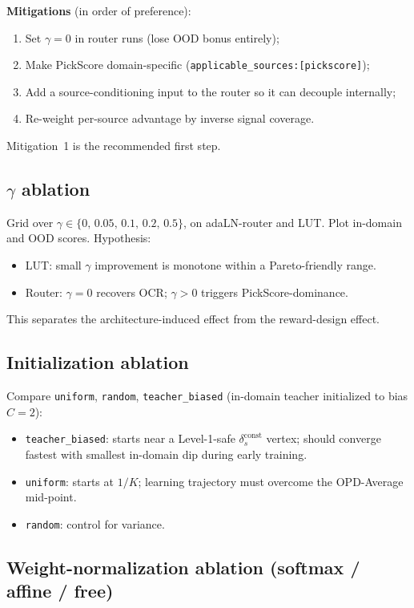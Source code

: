 \documentclass[11pt,a4paper]{article}
\newcommand{\const}{\mathrm{const}}
\theoremstyle{definition}
\begin{document}
\textbf{Mitigations} (in order of preference):
\begin{enumerate}[leftmargin=1.5em]
\item Set $\gamma=0$ in router runs (lose OOD bonus entirely);
\item Make PickScore domain-specific (\texttt{applicable\_sources:[pickscore]});
\item Add a source-conditioning input to the router so it can decouple
internally;
\item Re-weight per-source advantage by inverse signal coverage.
\end{enumerate}
Mitigation~1 is the recommended first step.

\subsection{$\gamma$ ablation}

Grid over $\gamma \in \{0,\,0.05,\,0.1,\,0.2,\,0.5\}$, on adaLN-router
and LUT. Plot in-domain and OOD scores. Hypothesis:
\begin{itemize}[leftmargin=1.5em]
\item LUT: small $\gamma$ improvement is monotone within a Pareto-friendly
range.
\item Router: $\gamma=0$ recovers OCR; $\gamma>0$ triggers
PickScore-dominance.
\end{itemize}
This separates the architecture-induced effect from the reward-design
effect.

\subsection{Initialization ablation}

Compare \texttt{uniform}, \texttt{random}, \texttt{teacher\_biased}
(in-domain teacher initialized to bias $C\!=\!2$):
\begin{itemize}[leftmargin=1.5em]
\item \texttt{teacher\_biased}: starts near a Level-1-safe
$\delta_s^{\const}$ vertex; should converge fastest with smallest
in-domain dip during early training.
\item \texttt{uniform}: starts at $1/K$; learning trajectory must overcome
the OPD-Average mid-point.
\item \texttt{random}: control for variance.
\end{itemize}

\subsection{Weight-normalization ablation (softmax / affine / free)}
\label{ssec:norm_ablation}
\end{document}
